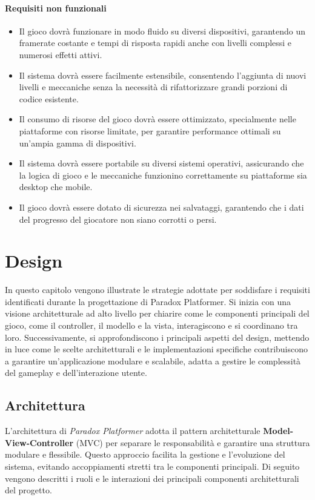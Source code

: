 \documentclass[a4paper,12pt]{report}
\begin{document}
	\subsubsection{Requisiti non funzionali}
	\begin{itemize}
		\item Il gioco dovrà funzionare in modo fluido su diversi dispositivi, garantendo un framerate costante e tempi di risposta rapidi anche con livelli complessi e numerosi effetti attivi.
		\item Il sistema dovrà essere facilmente estensibile, consentendo l’aggiunta di nuovi livelli e meccaniche senza la necessità di rifattorizzare grandi porzioni di codice esistente.
		\item Il consumo di risorse del gioco dovrà essere ottimizzato, specialmente nelle piattaforme con risorse limitate, per garantire performance ottimali su un’ampia gamma di dispositivi.
		\item Il sistema dovrà essere portabile su diversi sistemi operativi, assicurando che la logica di gioco e le meccaniche funzionino correttamente su piattaforme sia desktop che mobile.
		\item Il gioco dovrà essere dotato di sicurezza nei salvataggi, garantendo che i dati del progresso del giocatore non siano corrotti o persi.
	\end{itemize}
	
	\chapter{Design}
	
	In questo capitolo vengono illustrate le strategie adottate per soddisfare i requisiti identificati durante la progettazione di Paradox Platformer. Si inizia con una visione architetturale ad alto livello per chiarire come le componenti principali del gioco, come il controller, il modello e la vista, interagiscono e si coordinano tra loro. Successivamente, si approfondiscono i principali aspetti del design, mettendo in luce come le scelte architetturali e le implementazioni specifiche contribuiscono a garantire un'applicazione modulare e scalabile, adatta a gestire le complessità del gameplay e dell'interazione utente.
	
	\section{Architettura}
	
	L'architettura di \textit{Paradox Platformer} adotta il pattern architetturale \textbf{Model-View-Controller} (MVC) per separare le responsabilità e garantire una struttura modulare e flessibile. Questo approccio facilita la gestione e l'evoluzione del sistema, evitando accoppiamenti stretti tra le componenti principali. Di seguito vengono descritti i ruoli e le interazioni dei principali componenti architetturali del progetto.
	
\end{document}
